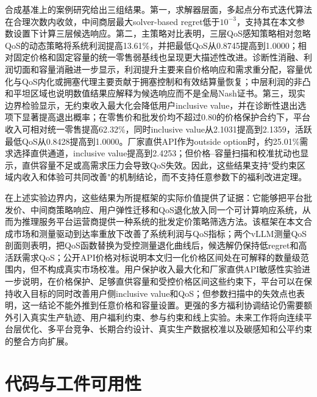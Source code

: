 \documentclass[UTF8,11pt]{ctexart}
\begin{document}
合成基准上的案例研究给出三组结果。第一，求解器层面，多起点分布式迭代算法在合理次数内收敛，中间商层最大solver-based regret低于$10^{-3}$，支持其在本文参数设置下计算三层候选响应。第二，主策略对比表明，三层QoS感知策略相对忽略QoS的动态策略将系统利润提高13.61\%，并把最低QoS从0.8745提高到1.0000；相对固定价格和固定容量的统一零售弱基线也呈现更大描述性改进。诊断性消融、利润切面和容量消融进一步显示，利润提升主要来自价格响应和需求重分配，容量优化与QoS内化或拥塞代理主要贡献于拥塞控制和有效结算量恢复；中层利润的非凸和平坦区域也说明数值结果应解释为候选响应而不是全局Nash证书。第三，现实边界检验显示，无约束收入最大化会降低用户inclusive value，并在诊断性退出选项下显著提高退出概率；在零售价和批发价均不超过0.80的价格保护合约下，平台收入可相对统一零售提高62.32\%，同时inclusive value从2.1031提高到2.1359，活跃最低QoS从0.8428提高到1.0000。厂家直供API作为outside option时，约25.01\%需求选择直供通道，inclusive value提高到2.4253；但价格--容量扫描和校准扰动也显示，直供容量不足或高需求压力会导致QoS失效。因此，这些结果支持"受约束区域内收入和体验可共同改善"的机制结论，而不支持任意参数下的福利改进定理。

在上述实验边界内，这些结果为所提框架的实际价值提供了证据：它能够把平台批发价、中间商策略响应、用户弹性迁移和QoS退化放入同一个可计算响应系统，从而为推理服务平台运营商提供一种系统的批发定价策略筛选方法。该框架在本文合成市场和测量驱动到达率重放下改善了系统利润与QoS指标；两个vLLM测量QoS剖面则表明，把QoS函数替换为受控测量退化曲线后，候选解仍保持低regret和高活跃需求QoS；公开API价格对标说明本文归一化价格区间处在可解释的数量级范围内，但不构成真实市场校准。用户保护收入最大化和厂家直供API敏感性实验进一步说明，在价格保护、足够直供容量和受控价格区间这些约束下，平台可以在保持收入目标的同时改善用户侧inclusive value和QoS；但参数扫描中的失效点也表明，这一结论不能外推到任意价格和容量设置。更强的多方福利协调结论仍需要额外引入真实生产轨迹、用户福利约束、参与约束和线上实验。未来工作将向连续平台层优化、多平台竞争、长期合约设计、真实生产数据校准以及碳感知和公平约束的整合方向扩展。

\section{代码与工件可用性}
\label{sec:code_availability}
\end{document}
